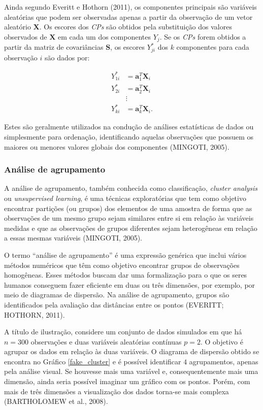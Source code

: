 \documentclass[12pt, a4paper,brazil,oneside]{article}
\begin{document}
	Ainda segundo Everitt e Hothorn (2011), os componentes principais são variáveis aleatórias que podem ser observadas apenas a partir da observação de um vetor aleatório $\boldsymbol{X}$. Os escores dos \textit{CPs} são obtidos pela substituição dos valores observados de $\boldsymbol{X}$ em cada um dos componentes $Y_j$. Se os \textit{CPs} forem obtidos a partir da matriz de covariâncias $\boldsymbol{S}$, os escores $Y^*_{ji}$ dos $k$ componentes para cada observação $i$ são dados por:  
	
	\begin{align*}
	Y^*_{1i} & =\boldsymbol{a}_1^T\boldsymbol{X}_i\\
	Y^*_{2i} & =\boldsymbol{a}_2^T\boldsymbol{X}_i\\
	&\vdots\\
	Y^*_{ki} & =\boldsymbol{a}_k^T\boldsymbol{X}_i.
	\end{align*}
	
	Estes são geralmente utilizados na condução de análises estatísticas de dados ou simplesmente para ordenação, identificando aquelas observações que possuem os maiores ou menores valores globais dos componentes (MINGOTI, 2005).
	
	\subsubsection{Análise de agrupamento} 
	
	A análise de agrupamento, também conhecida como classificação, \textit{cluster analysis} ou \textit{unsupervised learning}, é uma técnicas exploratórias que tem como objetivo encontrar partições (ou grupos) dos elementos de uma amostra de forma que as observações de um mesmo grupo sejam similares entre si em relação às variáveis medidas e que as observações de grupos diferentes sejam heterogêneas em relação a essas mesmas variáveis (MINGOTI, 2005).
	
	O termo ``análise de agrupamento'' é uma expressão genérica que inclui vários métodos numéricos que têm como objetivo encontrar grupos de observações homogêneas. Esses métodos buscam dar uma formalização para o que os seres humanos conseguem fazer eficiente em duas ou três dimensões, por exemplo, por meio de diagramas de dispersão. Na análise de agrupamento, grupos são identificados pela avaliação das distâncias entre os pontos (EVERITT; HOTHORN, 2011).
	
	
	A título de ilustração, considere um conjunto de dados simulados em que há $n=300$ observações e duas variáveis aleatórias contínuas $p=2$. O objetivo é agrupar os dados em relação às duas variáveis. O diagrama de dispersão obtido se encontra no Gráfico \ref{fake_cluster} e é possível identificar $4$ agrupamentos, apenas pela análise visual. Se houvesse mais uma variável e, consequentemente mais uma dimensão, ainda seria possível imaginar um gráfico com os pontos. Porém, com mais de três dimensões a visualização dos dados torna-se mais complexa (BARTHOLOMEW et al., 2008).
	
\end{document}
